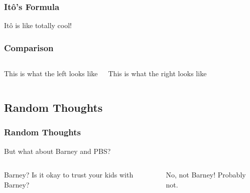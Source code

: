 \begin{frame}
  \frametitle{It\^o's Formula}
  It\^o is like totally cool!
\end{frame}


\begin{frame}
  \frametitle{Comparison}

  \begin{columns}[t]
    This is what the left looks like

    This is what the right looks like

  \end{columns}

\end{frame}


\subsection{Random Thoughts}
\begin{frame}
  \frametitle{Random Thoughts}
  But what about Barney and PBS?

  \begin{columns}[t]
    
    \begin{block}{Barney?}
      Is it okay to trust your kids with Barney?
    \end{block}
    \pause
  
    \begin{block}{No, not Barney!}
      Probably not.
    \end{block}

  \end{columns}


\end{frame}

